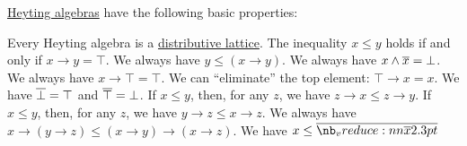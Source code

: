 \begin{proposition}\label{thm:def:heyting_algebra}
  \hyperref[def:heyting_algebra]{Heyting algebras} have the following basic properties:
  \begin{thmenum}
     Every Heyting algebra is a \hyperref[def:distributive_lattice]{distributive lattice}.
     The inequality \( x \leq y \) holds if and only if \( x \rightarrow y = \top \).
     We always have \( y \leq (x \rightarrow y) \).
     We always have \( x \wedge \oline{x} = \bot \).
     We always have \( x \rightarrow \top = \top \).
     We can \enquote{eliminate} the top element: \( \top \rightarrow x = x \).
     We have \( \oline{\bot} = \top \) and \( \oline{\top} = \bot \).
     If \( x \leq y \), then, for any \( z \), we have \( z \rightarrow x \leq z \rightarrow y \).
     If \( x \leq y \), then, for any \( z \), we have \( y \rightarrow z \leq x \rightarrow z \).
     We always have \( x \rightarrow (y \rightarrow z) \leq (x \rightarrow y) \rightarrow (x \rightarrow z) \).
     We have \( x \leq \doline{x} \)
  \end{thmenum}
\end{proposition}
